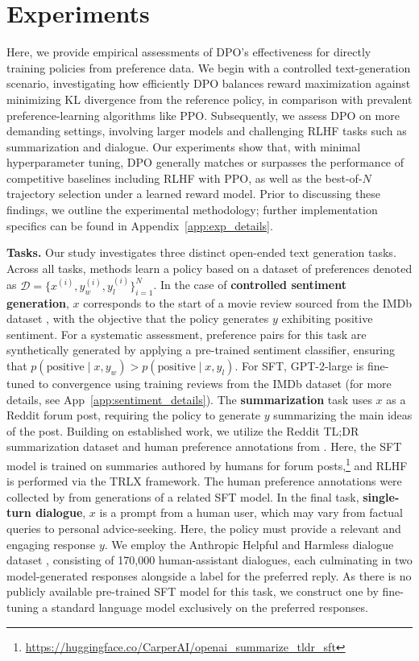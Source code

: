 \section{Experiments}
Here, we provide empirical assessments of DPO's effectiveness for directly training policies from preference data. We begin with a controlled text-generation scenario, investigating how efficiently DPO balances reward maximization against minimizing KL divergence from the reference policy, in comparison with prevalent preference-learning algorithms like PPO. Subsequently, we assess DPO on more demanding settings, involving larger models and challenging RLHF tasks such as summarization and dialogue. Our experiments show that, with minimal hyperparameter tuning, DPO generally matches or surpasses the performance of competitive baselines including RLHF with PPO, as well as the best-of-$N$ trajectory selection under a learned reward model. Prior to discussing these findings, we outline the experimental methodology; further implementation specifics can be found in Appendix~\ref{app:exp_details}.

\textbf{Tasks.} Our study investigates three distinct open-ended text generation tasks. Across all tasks, methods learn a policy based on a dataset of preferences denoted as $\mathcal{D}=\bigl\{x^{(i)}, y_w^{(i)}, y_l^{(i)}\bigr\}_{i=1}^N$. In the case of \textbf{controlled sentiment generation}, $x$ corresponds to the start of a movie review sourced from the IMDb dataset \cite{maas-EtAl:2011:ACL-HLT2011}, with the objective that the policy generates $y$ exhibiting positive sentiment. For a systematic assessment, preference pairs for this task are synthetically generated by applying a pre-trained sentiment classifier, ensuring that $p(\text{positive}\mid x,y_w)>p(\text{positive}\mid x,y_l)$. For SFT, GPT-2-large is fine-tuned to convergence using training reviews from the IMDb dataset (for more details, see App~\ref{app:sentiment_details}). The \textbf{summarization} task uses $x$ as a Reddit forum post, requiring the policy to generate $y$ summarizing the main ideas of the post. Building on established work, we utilize the Reddit TL;DR summarization dataset \citep{volske-etal-2017-tl} and human preference annotations from \citeauthor{stiennon2022learning}. Here, the SFT model is trained on summaries authored by humans for forum posts,\footnote{\url{https://huggingface.co/CarperAI/openai_summarize_tldr_sft}} and RLHF is performed via the TRLX \citep{leandro_von_werra_2023_7790115} framework. The human preference annotations were collected by \citeauthor{stiennon2022learning} from generations of a related SFT model. In the final task, \textbf{single-turn dialogue}, $x$ is a prompt from a human user, which may vary from factual queries to personal advice-seeking. Here, the policy must provide a relevant and engaging response $y$. We employ the Anthropic Helpful and Harmless dialogue dataset \citep{bai2022training}, consisting of 170,000 human-assistant dialogues, each culminating in two model-generated responses alongside a label for the preferred reply. As there is no publicly available pre-trained SFT model for this task, we construct one by fine-tuning a standard language model exclusively on the preferred responses.

